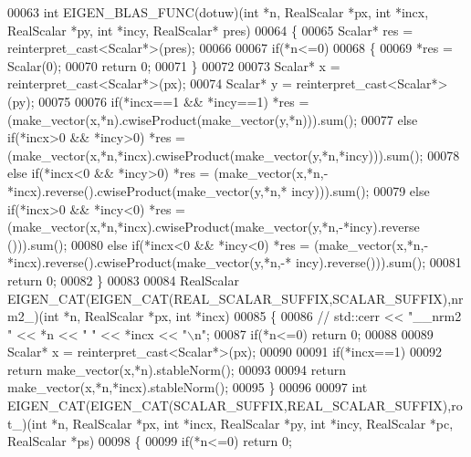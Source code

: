 \begin{DoxyCode}
00063 \textcolor{keywordtype}{int} EIGEN\_BLAS\_FUNC(dotuw)(\textcolor{keywordtype}{int} *n, RealScalar *px, \textcolor{keywordtype}{int} *incx, RealScalar *py, \textcolor{keywordtype}{int} *incy, RealScalar* pres)
00064 \{
00065   Scalar* res = \textcolor{keyword}{reinterpret\_cast<}Scalar*\textcolor{keyword}{>}(pres);
00066 
00067   \textcolor{keywordflow}{if}(*n<=0)
00068   \{
00069     *res = Scalar(0);
00070     \textcolor{keywordflow}{return} 0;
00071   \}
00072 
00073   Scalar* x = \textcolor{keyword}{reinterpret\_cast<}Scalar*\textcolor{keyword}{>}(px);
00074   Scalar* y = \textcolor{keyword}{reinterpret\_cast<}Scalar*\textcolor{keyword}{>}(py);
00075 
00076   \textcolor{keywordflow}{if}(*incx==1 && *incy==1)    *res = (make\_vector(x,*n).cwiseProduct(make\_vector(y,*n))).sum();
00077   \textcolor{keywordflow}{else} \textcolor{keywordflow}{if}(*incx>0 && *incy>0) *res = (make\_vector(x,*n,*incx).cwiseProduct(make\_vector(y,*n,*incy))).sum();
00078   \textcolor{keywordflow}{else} \textcolor{keywordflow}{if}(*incx<0 && *incy>0) *res = (make\_vector(x,*n,-*incx).reverse().cwiseProduct(make\_vector(y,*n,*
      incy))).sum();
00079   \textcolor{keywordflow}{else} \textcolor{keywordflow}{if}(*incx>0 && *incy<0) *res = (make\_vector(x,*n,*incx).cwiseProduct(make\_vector(y,*n,-*incy).reverse
      ())).sum();
00080   \textcolor{keywordflow}{else} \textcolor{keywordflow}{if}(*incx<0 && *incy<0) *res = (make\_vector(x,*n,-*incx).reverse().cwiseProduct(make\_vector(y,*n,-*
      incy).reverse())).sum();
00081   \textcolor{keywordflow}{return} 0;
00082 \}
00083 
00084 RealScalar EIGEN\_CAT(EIGEN\_CAT(REAL\_SCALAR\_SUFFIX,SCALAR\_SUFFIX),nrm2\_)(\textcolor{keywordtype}{int} *n, RealScalar *px, \textcolor{keywordtype}{int} *incx)
00085 \{
00086 \textcolor{comment}{//   std::cerr << "\_\_nrm2 " << *n << " " << *incx << "\(\backslash\)n";}
00087   \textcolor{keywordflow}{if}(*n<=0) \textcolor{keywordflow}{return} 0;
00088 
00089   Scalar* x = \textcolor{keyword}{reinterpret\_cast<}Scalar*\textcolor{keyword}{>}(px);
00090 
00091   \textcolor{keywordflow}{if}(*incx==1)
00092     \textcolor{keywordflow}{return} make\_vector(x,*n).stableNorm();
00093 
00094   \textcolor{keywordflow}{return} make\_vector(x,*n,*incx).stableNorm();
00095 \}
00096 
00097 \textcolor{keywordtype}{int} EIGEN\_CAT(EIGEN\_CAT(SCALAR\_SUFFIX,REAL\_SCALAR\_SUFFIX),rot\_)(\textcolor{keywordtype}{int} *n, RealScalar *px, \textcolor{keywordtype}{int} *incx, 
      RealScalar *py, \textcolor{keywordtype}{int} *incy, RealScalar *pc, RealScalar *ps)
00098 \{
00099   \textcolor{keywordflow}{if}(*n<=0) \textcolor{keywordflow}{return} 0;

\end{DoxyCode}
